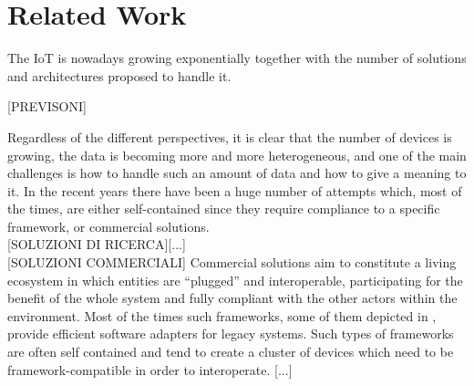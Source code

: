\documentclass[conference]{IEEEtran}
\begin{document}
\section{Related Work}

The IoT is nowadays growing exponentially together with the number of solutions and architectures proposed to handle it.

[PREVISONI]
 
Regardless of the different perspectives, it is clear that the number of devices is growing, the data is becoming more and more heterogeneous, and one of the main challenges is how to handle such an amount of data and how to give a meaning to it.
In the recent years there have been a huge number of attempts which, most of the times, are either self-contained since they require compliance to a specific framework, or commercial solutions.
\\

[SOLUZIONI DI RICERCA][...]
\\

[SOLUZIONI COMMERCIALI]
Commercial solutions aim to constitute a living ecosystem in which entities are ``plugged'' and interoperable, participating for the benefit of the whole system and fully compliant with the other actors within the environment.
Most of the times such frameworks, some of them depicted in \cite{derhamy2015survey}, provide efficient software adapters for legacy systems.
Such types of frameworks are often self contained and tend to create a cluster of devices which need to be framework-compatible in order to interoperate.
[...]
\end{document}
